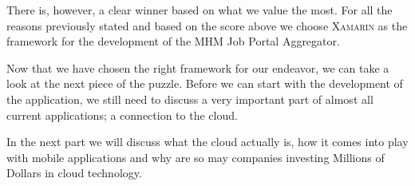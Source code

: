 There is, however, a clear winner based on what we value the most. For all the reasons previously stated and based on the score above we choose \textsc{Xamarin} as the framework for the development of the MHM Job Portal Aggregator.
\newline


Now that we have chosen the right framework for our endeavor, we can take a look at the next piece of the puzzle. Before we can start with the development of the application, we still need to discuss a very important part of almost all current applications; a connection to the cloud. 

In the next part we will discuss what the cloud actually is, how it comes into play with mobile applications and why are so may companies investing Millions of Dollars in cloud technology. 